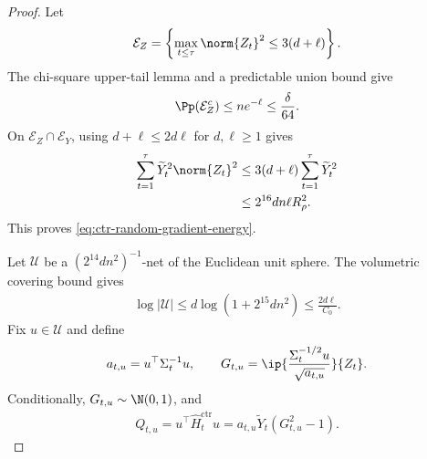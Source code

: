 \begin{proof}
    Let
    \begin{align}
        \mathcal E_Z
        =\left\{
        \max_{t\leq\tau}\norm{Z_t}^2
        \leq3(d+\ell)
        \right\}.
    \end{align}
    The chi-square upper-tail lemma and a predictable union bound give
    \begin{align}
        \Pp(\mathcal E_Z^c)\leq ne^{-\ell}\leq\frac\delta{64}.
        \label{eq:ctr-EZ-probability}
    \end{align}
    On $\mathcal E_Z\cap\mathcal E_Y$, using
    $d+\ell\leq2d\ell$ for $d,\ell\geq1$ gives
    \begin{align}
        \sum_{t=1}^{\tau}\widetilde Y_t^2\norm{Z_t}^2
         & \leq3(d+\ell)\sum_{t=1}^{\tau}\widetilde Y_t^2
        \\
         & \leq2^{16}dn\ell R_\rho^2.
    \end{align}
    This proves \eqref{eq:ctr-random-gradient-energy}.

    Let $\mathcal U$ be a $(2^{14}dn^2)^{-1}$-net of the Euclidean unit
    sphere.  The volumetric covering bound gives
    \begin{align}
        \log|\mathcal U|
        \leq d\log(1+2^{15}dn^2)
        \leq\frac{2d\ell}{C_0}.
        \label{eq:ctr-net-size}
    \end{align}
    Fix $u\in\mathcal U$ and define
    \begin{align}
        a_{t,u}=u^\top\Sigma_t^{-1}u,
        \qquad
        G_{t,u}
        =\ip{
            \frac{\Sigma_t^{-1/2}u}{\sqrt{a_{t,u}}}
        }{Z_t}.
        \label{eq:ctr-H-standardisation}
    \end{align}
    Conditionally, $G_{t,u}\sim\N(0,1)$, and
    \begin{align}
        Q_{t,u}
        =u^\top\widehat H_t^{\mathrm{ctr}}u
        =a_{t,u}\widetilde Y_t(G_{t,u}^2-1).
        \label{eq:ctr-H-direction}
    \end{align}


\end{proof}

